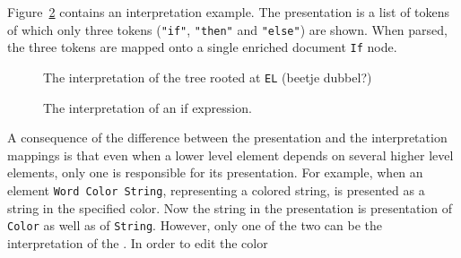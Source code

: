 Figure~\ref{interpretExample} contains an interpretation example. The presentation is a list of tokens of which only three tokens (\verb|"if"|, \verb|"then"| and \verb|"else"|) are shown. When parsed, the three tokens are mapped onto a single enriched document \verb|If| node. 

\begin{figure}
\begin{center}
\begin{center}
%
%
\end{center}
\caption{The interpretation of the tree rooted at {\tt EL} (beetje dubbel?)}\label{elementInterpretation} 
\end{center}
\end{figure}


\toHere     %

\begin{figure}
\begin{center}
\begin{center}
\end{center}
\caption{The interpretation of an if expression.}\label{interpretExample} 
\end{center}
\end{figure}

A consequence of the difference between the presentation and the interpretation mappings is that even when a lower level element depends on several higher level elements, only one is responsible for its presentation. For example, when an element \verb|Word Color String|, representing a colored string, is presented as a string in the specified color. Now the string in the presentation is presentation of \verb|Color| as well as of \verb|String|. However, only one of the two can be the interpretation of the . In order to edit the color


   

